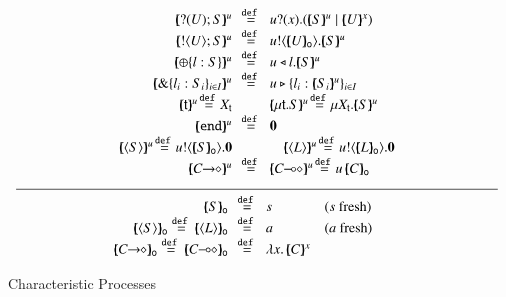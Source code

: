 \smallskip
\begin{figure}[t]
	\[
	\begin{array}{c}
		\begin{array}{rclcl}
			\mapchar{\btinp{U} S}{u} &\!\!\defeq\!\!
& \binp{u}{x} (\mapchar{S}{u} \Par \mapchar{U}{x})
			\\
			\mapchar{\btout{U} S}{u} &\!\!\defeq\!\!& \bout{u}{\omapchar{U}} \mapchar{S}{u} %
			\\
			\mapchar{\btsel{l : S}}{u} &\!\!\defeq\!\!& \bsel{u}{l} \mapchar{S}{u}
			\\
			\mapchar{\btbra{l_i: S_i}_{i \in I}}{u} &\!\!\defeq\!\!& \bbra{u}{l_i: \mapchar{S_i}{u}}_{i \in I}
			\\
		\mapchar{\tvar{t}}{u} \!\defeq\! \varp{X}_{\vart{t}}
& & 
			\mapchar{\trec{t}{S}}{u} \!\defeq\! \recp{X_{\vart{t}}}{\mapchar{S}{u}}
			\\
			\mapchar{\tinact}{u} &\!\!\defeq\!\!& \inact
			\\
\mapchar{\chtype{S}}{u} \!\defeq\! \bout{u}{\omapchar{S}} \inact & & 
\quad\mapchar{\chtype{L}}{u} \!\defeq\! \bout{u}{\omapchar{L}} \inact
			\\
\mapchar{\shot{C}}{u} & \!\!\defeq\!\! & \mapchar{\lhot{C}}{u} \!\defeq\! 
\appl{u}{\omapchar{C}}
\end{array}
\\
\Hline
\\
		\begin{array}{rcll}
\omapchar{S} &\!\!\defeq\!\!& s & (s \textrm{ fresh})
			\\
\omapchar{\chtype{S}} \defeq \omapchar{\chtype{L}} &\!\!\defeq\!\!& a & 
(a \textrm{ fresh})\quad\quad
			\\
			\omapchar{\shot{C}} \defeq \omapchar{\lhot{C}} &\!\!\defeq\!\!& \abs{x}{\mapchar{C}{x}}
		\end{array}
	\end{array}
	\]
\caption{Characteristic Processes\label{fig:char}}
\Hline
\end{figure}


